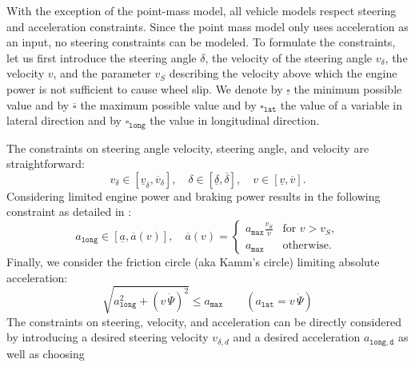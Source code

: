 \documentclass[11pt,a4paper]{article}
\renewcommand{\^}[1]{^{(#1)}}
\begin{document}
With the exception of the point-mass model, all vehicle models respect steering and acceleration constraints. Since the point mass model only uses acceleration as an input, no steering constraints can be modeled. To formulate the constraints, let us first introduce the steering angle $\delta$, the velocity of the steering angle $v_\delta$, the velocity $v$, and the parameter $v_S$ describing the velocity above which the engine power is not sufficient to cause wheel slip. We denote by $\underline{\square}$ the minimum possible value and by $\overline{\square}$ the maximum possible value and by $\square_\mathtt{lat}$ the value of a variable in lateral direction and by $\square_\mathtt{long}$ the value in longitudinal direction. 

The constraints on steering angle velocity, steering angle, and velocity are straightforward:
\begin{equation}
 v_\delta \in [\underline{v}_\delta, \overline{v}_\delta], \quad \delta \in [\underline{\delta}, \overline{\delta}], \quad v \in [\underline{v}, \overline{v}]. \label{eq:remainingRestrictions}
\end{equation}
Considering limited engine power and braking power results in the following constraint as detailed in \cite[Sec.~III.B]{Althoff2016d}:
\begin{equation}
 a_\mathtt{long} \in [\underline{a},\overline{a}(v)], \quad \overline{a}(v) = \begin{cases}
                                                                                            a_\mathtt{max}\frac{v_S}{v} & \text{for } v > v_S, \\
                                                                                            a_\mathtt{max} & \text{otherwise}.
                                                                                           \end{cases} \label{eq:longitudinalRestriction} 
\end{equation}
Finally, we consider the friction circle (aka Kamm's circle) limiting absolute acceleration:
\begin{equation}
\sqrt{a_\mathtt{long}^2 + (v\, \dot{\Psi})^2} \leq a_\mathtt{max} \qquad (a_\mathtt{lat} = v\, \dot{\Psi}) \label{eq:lateralRestriction} 
\end{equation}
The constraints on steering, velocity, and acceleration can be directly considered by introducing a desired steering velocity $v_{\delta,d}$ and a desired acceleration $a_\mathtt{long,d}$ as well as choosing 
\end{document}
